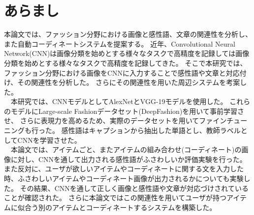 \chapter{あらまし}

本論文では、ファッション分野における画像と感性語、文章の関連性を分析し、また自動コーディネートシステムを提案する。
近年、Convolutional Neural Network(CNN)は画像分類を始めとする様々なタスクで高精度を記録しては画像分類を始めとする様々なタスクで高精度を記録してきた。
そこで本研究では、ファッション分野における画像をCNNに入力することで感性語や文章と対応付け、その関連性を分析した。
さらにその関連性を用いた周辺システムを考案した。
\\
　本研究では、CNNモデルとしてAlexNetとVGG-19モデルを使用した。
これらのモデルにLarge-scale Fashionデータセット(DeepFashion)を用いて事前学習させ、
さらに表現力を高めるため、実際のデータセットを用いてファインチューニングも行った。
感性語はキャプションから抽出した単語とし、教師ラベルとしてCNNを学習させた。
\\
　本論文では、アイテムごと、またアイテムの組み合わせ(コーディネート)の画像に対し、CNNを通して出力される感性語がふさわしいか評価実験を行った。
また反対に、ユーザが欲しいアイテムやコーディネートに関する文を入力した時、ふさわしいアイテムやコーディネート画像が出力されるかについても実験した。
その結果、CNNを通して正しく画像と感性語や文章が対応づけされていることが確認された。
さらに本論文ではこの関連性を用いてユーザが持つアイテムに似合う別のアイテムとコーディネートするシステムを構築した。
